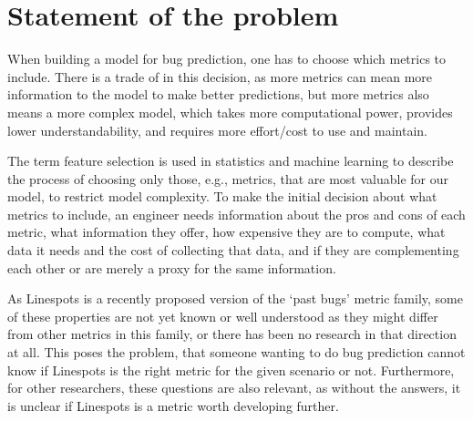 \section{Statement of the problem} 

When building a model for bug prediction, one has to choose which metrics to include. There is a trade of in this decision, as more metrics can mean more information to the model to make better predictions, but more metrics also means a more complex model, which takes more computational power, provides lower understandability, and requires more effort\slash cost to use and maintain.

The term feature selection is used in statistics and machine learning to describe the process of choosing only those, e.g., metrics, that are most valuable for our model, to restrict model complexity. To make the initial decision about what metrics to include, an engineer needs information about the pros and cons of each metric, what information they offer, how expensive they are to compute, what data it needs and the cost of collecting that data, and if they are complementing each other or are merely a proxy for the same information.

As Linespots is a recently proposed version of the `past bugs' metric family, some of these properties are not yet known or well understood as they might differ from other metrics in this family, or there has been no research in that direction at all. This poses the problem, that someone wanting to do bug prediction cannot know if Linespots is the right metric for the given scenario or not. Furthermore, for other researchers, these questions are also relevant, as without the answers, it is unclear if Linespots is a metric worth developing further.
